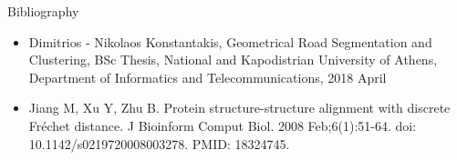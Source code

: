 \documentclass{beamer}
\begin{document}
%


\begin{frame}{Bibliography}
  \begin{itemize}
    \item Dimitrios - Nikolaos Konstantakis, Geometrical Road Segmentation and Clustering, BSc Thesis, National and Kapodistrian University of Athens, Department of Informatics and Telecommunications, 2018 April
    \item Jiang M, Xu Y, Zhu B. Protein structure-structure alignment with discrete Fréchet distance. J Bioinform Comput Biol. 2008 Feb;6(1):51-64. doi: 10.1142/s0219720008003278. PMID: 18324745.
  \end{itemize}
\end{frame}
\end{document}
